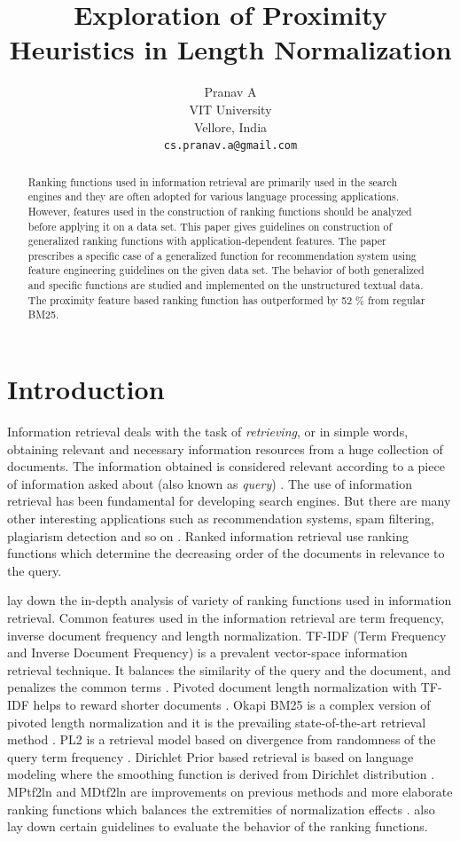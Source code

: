 \documentclass[11pt]{article}
\title{Exploration of Proximity Heuristics in Length Normalization}
\author{Pranav A \\
	VIT University \\
	Vellore, India \\
	{\tt cs.pranav.a@gmail.com} }
\date{}
\begin{document}
	\maketitle
	\begin{abstract}
		Ranking functions used in information retrieval are primarily used in the search engines and they are often adopted for various language processing applications.
		However, features used in the construction of ranking functions should be analyzed before applying it on a data set. 
		This paper gives guidelines on construction of generalized ranking functions with application-dependent features. 
		The paper prescribes a specific case of a generalized function for recommendation system using feature engineering guidelines on the given data set. 
		The behavior of both generalized and specific functions are studied and implemented on the unstructured textual data. 
		The proximity feature based ranking function has outperformed by 52 \% from regular BM25.
	\end{abstract}
	
	\section{Introduction}
	
	Information retrieval deals with the task of \textit{retrieving}, or in simple words, obtaining relevant and necessary information resources from a huge collection of documents. The information obtained is considered relevant according to a piece of information asked about (also known as \textit{query}) \cite{zhai2016text}. The use of information retrieval has been fundamental for developing search engines. But there are many other interesting applications such as recommendation systems, spam filtering, plagiarism detection and so on \cite{Manning:2008:IIR:1394399}. Ranked information retrieval use ranking functions which determine the decreasing order of the documents in relevance to the query.
	
	 lay down the in-depth analysis of variety of ranking functions used in information retrieval. Common features used in the information retrieval are term frequency, inverse document frequency and length normalization. TF-IDF (Term Frequency and Inverse Document Frequency) is a prevalent vector-space information retrieval technique. It balances the similarity of the query and the document, and penalizes the common terms \cite{tfidf}. Pivoted document length normalization with TF-IDF helps to reward shorter documents \cite{pl}. Okapi BM25 is a complex version of pivoted length normalization and it is the prevailing state-of-the-art retrieval method \cite{bm25}. PL2 is a retrieval model based on divergence from randomness of the query term frequency \cite{PL2}. Dirichlet Prior based retrieval is based on language modeling  where the smoothing function is derived from Dirichlet distribution \cite{dirich}. MPtf2ln and MDtf2ln are improvements on previous methods and more elaborate ranking functions which balances the extremities of normalization effects \cite{Fang}.  also lay down certain guidelines to evaluate the behavior of the ranking functions.
	
\end{document}
